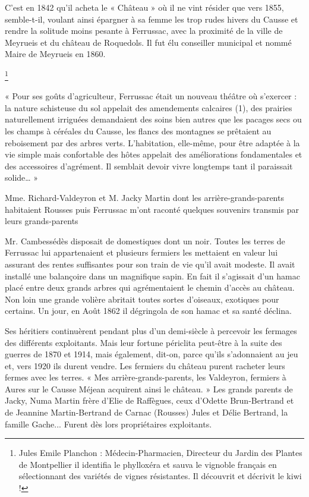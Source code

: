 C’est en 1842 qu’il acheta le « Château » où il ne vint résider que vers 1855, semble-t-il, voulant ainsi
épargner à sa femme les trop rudes hivers du Causse et rendre la solitude moins pesante à Ferrussac,
avec la proximité de la ville de Meyrueis et du château de Roquedols.
Il fut élu conseiller municipal et nommé Maire de Meyrueis en 1860.

\footnote{Jules Emile Planchon : Médecin-Pharmacien, Directeur du Jardin des Plantes de Montpellier il identifia le
phylloxéra et sauva le vignoble français en sélectionnant des variétés de vignes résistantes. Il découvrit et
décrivit le kiwi !}


« Pour ses goûts d’agriculteur, Ferrussac était un nouveau théâtre où s’exercer : la nature
schisteuse du sol appelait des amendements calcaires (1), des prairies naturellement irriguées
demandaient des soins bien autres que les pacages secs ou les champs à céréales du Causse,
les flancs des montagnes se prêtaient au reboisement par des arbres verts.
L’habitation, elle-même, pour être adaptée à la vie simple mais confortable des hôtes appelait
des améliorations fondamentales et des accessoires d’agrément. Il semblait devoir vivre
longtemps tant il paraissait solide… »

Mme. Richard-Valdeyron et M. Jacky Martin dont les arrière-grands-parents habitaient Rousses puis Ferrussac
m’ont raconté quelques souvenirs transmis par leurs grands-parents

\begin{tcolorbox}
Mr. Cambessédès disposait de domestiques dont un noir. Toutes les terres de Ferrussac lui appartenaient et
plusieurs fermiers les mettaient en valeur lui assurant des rentes suffisantes pour son train de vie qu’il avait
modeste. Il avait installé une balançoire dans un magnifique sapin. En fait il s’agissait d’un hamac placé entre
deux grands arbres qui agrémentaient le chemin d’accès au château. Non loin une grande volière abritait
toutes sortes d’oiseaux, exotiques pour certains. Un jour, en Août 1862 il dégringola de son hamac et sa santé
déclina.

Ses héritiers continuèrent pendant plus d’un demi-siècle à percevoir les fermages des différents exploitants. Mais
leur fortune périclita peut-être à la suite des guerres de 1870 et 1914, mais également, dit-on, parce qu’ils
s’adonnaient au jeu et, vers 1920 ils durent vendre.
Les fermiers du château purent racheter leurs fermes avec les terres.
« Mes arrière-grands-parents, les Valdeyron, fermiers à Aures sur le Causse Méjean acquirent ainsi le château. »
Les grands parents de Jacky, Numa Martin frère d’Elie de Raffègues, ceux d’Odette Brun-Bertrand et de
Jeannine Martin-Bertrand de Carnac (Rousses) Jules et Délie Bertrand, la famille Gache... Furent dès lors
propriétaires exploitants.
\end{tcolorbox}

